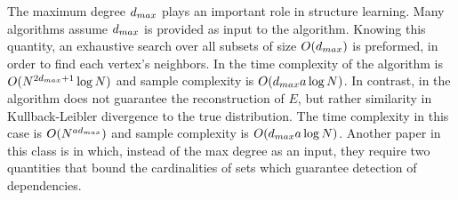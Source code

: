 The maximum degree $d_{max}$ plays an important role in structure learning.
Many algorithms \cite{bresler2008reconstruction, abbeel2006learning} assume $d_{max}$ is provided as input to the algorithm.
Knowing this quantity, an exhaustive search over all subsets of size $O(d_{max})$ is preformed, in order to find each vertex's neighbors.
In \cite{bresler2008reconstruction} the time complexity of the algorithm is $O({N}^{2d_{max}+1}\log N)$ and sample complexity is $O(d_{max} a \log N)$.
In contrast, in \cite{abbeel2006learning} the algorithm does not guarantee the reconstruction of $E$, but rather similarity in Kullback-Leibler divergence to the true distribution.
The time complexity in this case is $O({N}^{a d_{max}})$ and sample complexity is $O(d_{max} a \log {N})$.
Another paper in this class is \cite{wu2013learning} in which, instead of the max degree as an input, they require two quantities that bound the cardinalities of sets which guarantee detection of dependencies. 


